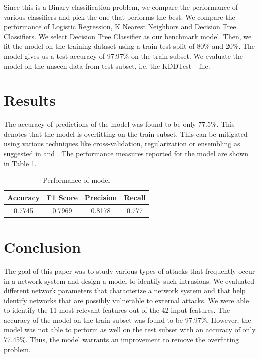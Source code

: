 \documentclass[conference]{IEEEtran}
\begin{document}
Since this is a Binary classification problem, we compare the performance of various classifiers and pick the one that performs the best. We compare the performance of Logistic Regression, K Nearest Neighbors and Decision Tree Classifiers. We select Decision Tree Classifier as our benchmark model. Then, we fit the model on the training dataset using a train-test split of 80\% and 20\%. The model gives us a test accuracy of 97.97\% on the train subset. We evaluate the model on the unseen data from test subset, i.e. the KDDTest+ file. 

\section{Results}
The accuracy of predictions of the model was found to be only 77.5\%. This denotes that the model is overfitting on the train subset. This can be mitigated using various techniques like cross-validation, regularization or ensembling as suggested in \cite{b3} and \cite{b4}. The performance measures reported for the model are shown in Table \ref{tab3}.
\begin{table}[htbp]
\caption{Performance of model}
\begin{center}
\begin{tabular}{|c|c|c|c|}
\hline
Accuracy	&	F1 Score	&	Precision	&	Recall	\\
\hline
0.7745 &	 0.7969  &	 0.8178  &	0.777\\
\hline
\end{tabular}
\label{tab3}
\end{center}
\end{table}

\section{Conclusion}
The goal of this paper was to study various types of attacks that frequently occur in a network system and design a model to identify such intrusions. We evaluated different network parameters that characterize a network system and that help identify networks that are possibly vulnerable to external attacks. We were able to identify the 11 most relevant features out of the 42 input features. The accuracy of the model on the train subset was found to be 97.97\%. However, the model was not able to perform as well on the test subset with an accuracy of only 77.45\%. Thus, the model warrants an improvement to remove the overfitting problem.
\end{document}
